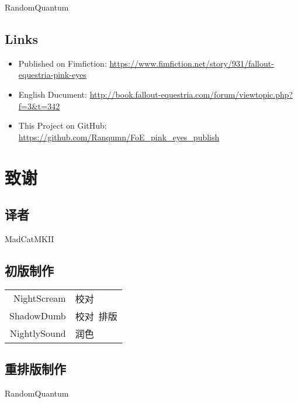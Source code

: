 \begin{center}
    RandomQuantum
\end{center}

\section*{Links}

\begin{itemize}
    \item Published on Fimfiction: \url{https://www.fimfiction.net/story/931/fallout-equestria-pink-eyes}
    \item English Ducument: \url{http://book.fallout-equestria.com/forum/viewtopic.php?f=3\&t=342}
    \item This Project on GitHub: \url{https://github.com/Ranqumn/FoE_pink_eyes_publish}
\end{itemize}

\chapter{致谢}

\section*{译者}

\begin{center}
    MadCatMKII
\end{center}

\section*{初版制作}

\begin{table}[ht!]
    \centering
    \begin{tabular}{rl}
        NightScream & 校对 \\
        ShadowDumb & 校对\ 排版 \\
        NightlySound & 润色 \\
    \end{tabular}
\end{table}

\section*{重排版制作}

\begin{center}
    RandomQuantum
\end{center}


